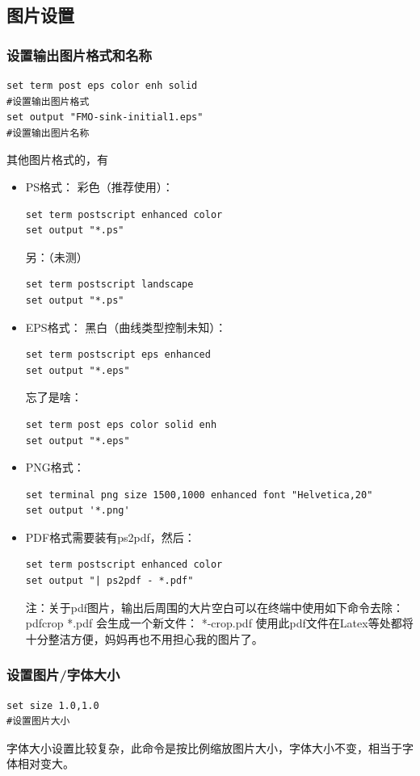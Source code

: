 \subsection{图片设置}
\subsubsection{设置输出图片格式和名称}
\begin{verbatim}
set term post eps color enh solid
#设置输出图片格式
set output "FMO-sink-initial1.eps"
#设置输出图片名称
\end{verbatim}

其他图片格式的，有
\begin{itemize}
\item PS格式：
彩色（推荐使用）：
\begin{verbatim}
set term postscript enhanced color
set output "*.ps"
\end{verbatim}
另：（未测）
\begin{verbatim}
set term postscript landscape
set output "*.ps"
\end{verbatim}

\item EPS格式：
黑白（曲线类型控制未知）：
\begin{verbatim}
set term postscript eps enhanced
set output "*.eps"
\end{verbatim}
忘了是啥：
\begin{verbatim}
set term post eps color solid enh
set output "*.eps"
\end{verbatim}

\item PNG格式：
\begin{verbatim}
set terminal png size 1500,1000 enhanced font "Helvetica,20"
set output '*.png'
\end{verbatim}

\item PDF格式需要装有ps2pdf，然后：
\begin{verbatim}
set term postscript enhanced color
set output "| ps2pdf - *.pdf"
\end{verbatim}

注：关于pdf图片，输出后周围的大片空白可以在终端中使用如下命令去除：
pdfcrop *.pdf
会生成一个新文件： *-crop.pdf
使用此pdf文件在Latex等处都将十分整洁方便，妈妈再也不用担心我的图片了。
\end{itemize}


\subsubsection{设置图片/字体大小}
\begin{verbatim}
set size 1.0,1.0
#设置图片大小
\end{verbatim}
字体大小设置比较复杂，此命令是按比例缩放图片大小，字体大小不变，相当于字体相对变大。



